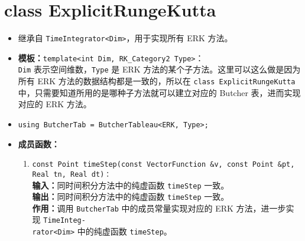 \documentclass[a4paper,twoside]{ctexart}
\begin{document}
\section{class ExplicitRungeKutta}
\begin{itemize}
    \item 继承自 \texttt{TimeIntegrator<Dim>}，用于实现所有 ERK 方法。
    \item \textbf{模板：}\texttt{template<int Dim, RK\_Category2 Type>}：\\\texttt{Dim} 表示空间维数，\texttt{Type} 是 ERK 方法的某个子方法。这里可以这么做是因为所有 ERK 方法的数据结构都是一致的，所以在 \texttt{class ExplicitRungeKutta} 中，只需要知道所用的是哪种子方法就可以建立对应的 Butcher 表，进而实现对应的 ERK 方法。
    \item \texttt{using ButcherTab = ButcherTableau<ERK, Type>;}
    \item \textbf{成员函数：}
            \begin{enumerate}[(1)]
                \item \texttt{const Point timeStep(const VectorFunction \&v, const Point \&pt, Real tn, Real dt)：}\\
                \textbf{输入：}同时间积分方法中的纯虚函数 \texttt{timeStep} 一致。\\
                \textbf{输出：}同时间积分方法中的纯虚函数 \texttt{timeStep} 一致。\\
                \textbf{作用：}调用 \texttt{ButcherTab} 中的成员常量实现对应的 ERK 方法，进一步实现 \texttt{TimeInteg-\\rator<Dim>} 中的纯虚函数 \texttt{timeStep}。
            \end{enumerate}
\end{itemize}
\end{document}
